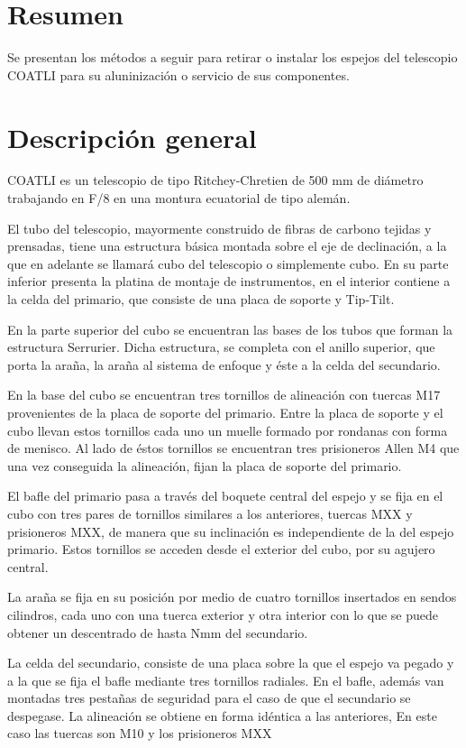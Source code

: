 \section{Resumen}

Se presentan los métodos a seguir para retirar o instalar los espejos del telescopio COATLI para su aluninización o servicio de sus componentes.

\section{Descripción general}

COATLI es un telescopio de tipo Ritchey-Chretien de 500 mm de diámetro trabajando en F/8 en una montura ecuatorial de tipo alemán.

El tubo del telescopio, mayormente construido de fibras de carbono tejidas y prensadas, tiene una estructura básica montada sobre el eje de declinación, a la que en adelante se llamará cubo del telescopio o simplemente cubo. En su parte inferior presenta la platina de montaje de instrumentos, en el interior contiene a la celda del primario, que consiste de una placa de soporte y Tip-Tilt. 

En la parte superior del cubo se encuentran las bases de los tubos que forman la estructura Serrurier. Dicha estructura, se completa con el anillo superior, que porta la araña, la araña al sistema de enfoque y éste a la celda del secundario. 

En la base del cubo se encuentran tres tornillos de alineación con tuercas M17 provenientes de la placa de soporte del primario. Entre la placa de soporte y el cubo llevan estos tornillos cada uno un muelle formado por rondanas con forma de menisco. Al lado de éstos tornillos se encuentran tres prisioneros Allen M4 que una vez conseguida la alineación, fijan la placa de soporte del primario.

El bafle del primario pasa a través del boquete central del espejo y se fija en el cubo con tres pares de tornillos similares a los anteriores, tuercas MXX y prisioneros MXX, de manera que su inclinación es independiente de la del espejo primario. Estos tornillos se acceden desde el exterior del cubo, por su agujero central.

La araña se fija en su posición por medio de cuatro tornillos insertados en sendos cilindros, cada uno con una tuerca exterior y otra interior con lo que se puede obtener un descentrado de hasta Nmm del secundario.

La celda del secundario, consiste de una placa sobre la que el espejo va pegado y a la que se fija el bafle mediante tres tornillos radiales. En el bafle, además van montadas tres pestañas de seguridad para el caso de que el secundario se despegase. La alineación se obtiene en forma idéntica a las anteriores, En este caso las tuercas son M10 y los prisioneros MXX

